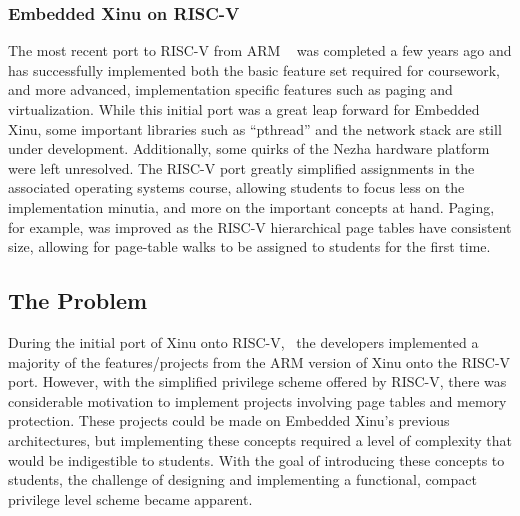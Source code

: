 \subsubsection{Embedded Xinu on RISC-V}

The most recent port to RISC-V from ARM ~\cite{XINU_RISCV_port} was completed a few years ago and has successfully implemented both the basic feature set required for coursework, and more advanced, implementation specific features such as paging and virtualization. While this initial port was a great leap forward for Embedded Xinu, some important libraries such as ``pthread'' and the network stack are still under development. Additionally, some quirks of the Nezha hardware platform were left unresolved. The RISC-V port greatly simplified assignments in the associated operating systems course, allowing students to focus less on the implementation minutia, and more on the important concepts at hand. Paging, for example, was improved as the RISC-V hierarchical page tables have consistent size, allowing for page-table walks to be assigned to students for the first time.

\subsection{The Problem}

During the initial port of Xinu onto RISC-V,~\cite{XINU_RISCV_port} the developers implemented a majority of the features/projects from the ARM version of Xinu onto the RISC-V port. However, with the simplified privilege scheme offered by RISC-V, there was considerable motivation to implement projects involving page tables and memory protection. These projects could be made on Embedded Xinu's previous architectures, but implementing these concepts required a level of complexity that would be indigestible to students. With the goal of introducing these concepts to students, the challenge of designing and implementing a functional, compact privilege level scheme became apparent. 
